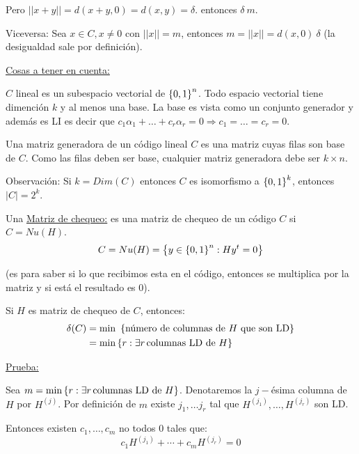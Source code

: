 \documentclass[12pt,a4paper]{article}
\begin{document}
Pero $||x+y|| = d(x+y,0) = d(x,y) = \delta$. entonces $\delta \> m$.
\medskip

Viceversa: Sea $x\in C, x\neq 0$ con $||x|| = m$, entonces $m= ||x|| = d(x,0) \> \delta$ 
(la desigualdad sale por definición).
\medskip

\underline{Cosas a tener en cuenta:}
\medskip

$C$ lineal es un subespacio vectorial de $\left\lbrace 0,1 \right\rbrace^{n}$. Todo espacio vectorial 
tiene dimención $k$ y al menos una base. La base es vista como un conjunto generador y 
además es LI es decir que $c_{1}\alpha_{1}+\ldots + c_{r}\alpha_{r} = 0 \Rightarrow c_{1} = \ldots = c_{r} = 0$.
\medskip

Una matriz generadora de un código lineal $C$ es una matriz cuyas filas son base de $C$. 
Como las filas deben ser base, cualquier matriz generadora debe ser $k\times n$.
\medskip

Observación: Si $k=Dim(C)$ entonces $C$ es isomorfismo a $\left\lbrace 0,1 \right\rbrace^{k}$, entonces 
$|C| = 2^{k}$.
\medskip

\begin{definition}
Una \underline{Matriz de chequeo:} es una matriz de chequeo de un código $C$ si 
$C = Nu(H)$.
$$C = Nu(H) = \left\lbrace y\in \left\lbrace 0,1 \right\rbrace^{n}: Hy^{t} = 0 \right\rbrace$$
\end{definition}

(es para saber si lo que recibimos esta en el código, entonces se multiplica por 
la matriz y si está el resultado es 0).

\begin{teorema} Si $H$ es matriz de chequeo de $C$, entonces:
    \begin{align*}
        \delta(C) &= \min\,\,\left\lbrace \text{número de columnas de $H$ que son LD} \right\rbrace\\
        &= \min \left\lbrace r: \exists r\,\text{columnas LD de $H$} \right\rbrace
    \end{align*}
\end{teorema}

\underline{Prueba:}
\medskip

Sea $m = \min \left\lbrace r: \exists r\,\text{columnas LD de $H$} \right\rbrace$. Denotaremos la 
$j-$ésima columna de $H$ por $H^{(j)}$. Por definición de $m$ existe 
$j_{1},\ldots j_{r}$ tal que $H^{(j_{1})},\ldots, H^{(j_{r})}$ son LD.
\medskip

Entonces existen $c_{1},\ldots, c_{m}$ no todos $0$ tales que:
$$c_{1}H^{(j_{1})} + \cdots + c_{m}H^{(j_{r})} = 0$$
\end{document}
